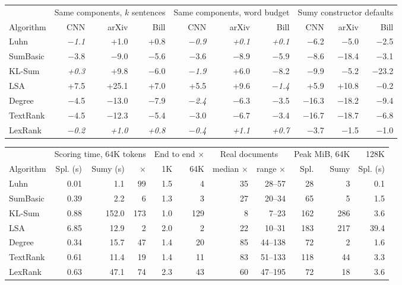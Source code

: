 \begin{tabular}{l rrr rrr rrr}
\toprule
 & \multicolumn{3}{c}{Same components, $k$ sentences} & \multicolumn{3}{c}{Same components, word budget} & \multicolumn{3}{c}{Sumy constructor defaults} \\
\cmidrule(lr){2-4}\cmidrule(lr){5-7}\cmidrule(lr){8-10}
Algorithm & CNN & arXiv & Bill & CNN & arXiv & Bill & CNN & arXiv & Bill \\
\midrule
Luhn & \textit{$-$1.1} & +1.0 & +0.8 & \textit{$-$0.9} & \textit{+0.1} & \textit{+0.1} & $-$6.2 & $-$5.0 & $-$2.5 \\
SumBasic & $-$3.8 & $-$9.0 & $-$5.6 & $-$3.6 & $-$8.9 & $-$5.9 & $-$8.6 & $-$18.4 & $-$3.1 \\
KL-Sum & \textit{+0.3} & +9.8 & $-$6.0 & \textit{$-$1.9} & +6.0 & $-$8.2 & $-$9.9 & $-$5.2 & $-$23.2 \\
LSA & +7.5 & +25.1 & +7.0 & +5.5 & +9.6 & \textit{$-$1.4} & +5.9 & +10.8 & $-$0.2 \\
Degree & $-$4.5 & $-$13.0 & $-$7.9 & \textit{$-$2.4} & $-$6.3 & $-$3.5 & $-$16.3 & $-$18.2 & $-$9.4 \\
TextRank & $-$4.5 & $-$12.3 & $-$5.4 & $-$3.0 & $-$6.7 & $-$3.4 & $-$16.7 & $-$18.7 & $-$6.8 \\
LexRank & \textit{$-$0.2} & \textit{+1.0} & \textit{+0.8} & \textit{$-$0.4} & \textit{+1.1} & \textit{+0.7} & $-$3.7 & $-$1.5 & $-$1.0 \\
\bottomrule
\end{tabular}


\begin{tabular}{l rrr rr rr rr r}
\toprule
 & \multicolumn{3}{c}{Scoring time, 64K tokens} & \multicolumn{2}{c}{End to end $\times$} & \multicolumn{2}{c}{Real documents} & \multicolumn{2}{c}{Peak MiB, 64K} & 128K \\
\cmidrule(lr){2-4}\cmidrule(lr){5-6}\cmidrule(lr){7-8}\cmidrule(lr){9-10}
Algorithm & Spl. (s) & Sumy (s) & $\times$ & 1K & 64K & median $\times$ & range $\times$ & Spl. & Sumy & Spl. (s) \\
\midrule
Luhn & 0.01 & 1.1 & 99 & 1.5 & 4 & 35 & 28--57 & 28 & 3 & 0.1 \\
SumBasic & 0.39 & 2.2 & 6 & 1.3 & 3 & 27 & 20--34 & 65 & 5 & 1.5 \\
KL-Sum & 0.88 & 152.0 & 173 & 1.0 & 129 & 8 & 7--23 & 162 & 286 & 3.6 \\
LSA & 6.85 & 12.9 & 2 & 2.0 & 2 & 22 & 10--31 & 183 & 217 & 39.4 \\
Degree & 0.34 & 15.7 & 47 & 1.4 & 20 & 85 & 44--138 & 72 & 2 & 1.6 \\
TextRank & 0.61 & 11.4 & 19 & 1.4 & 11 & 83 & 51--133 & 118 & 44 & 3.3 \\
LexRank & 0.63 & 47.1 & 74 & 2.3 & 43 & 60 & 47--195 & 72 & 18 & 3.6 \\
\bottomrule
\end{tabular}
